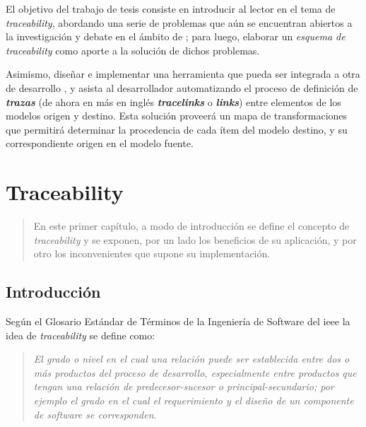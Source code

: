 \documentclass[a4paper,12pt,twoside,spanish,openright]{book}
\begin{document}
El objetivo del trabajo de tesis consiste en introducir al lector en el tema de \textit{traceability}, abordando una serie de problemas que aún se encuentran abiertos a la investigación y debate en el ámbito de ; para luego, elaborar un \textit{esquema de traceability} como aporte a la solución de dichos problemas.

Asimismo, diseñar e implementar una herramienta que pueda ser integrada a otra de desarrollo , y asista al desarrollador automatizando el proceso de definición de \textit{\textbf{trazas}} (de ahora en más en inglés \textit{\textbf{tracelinks}} o \textit{\textbf{links}}) entre elementos de los modelos origen y destino. Esta solución proveerá un mapa de transformaciones que permitirá determinar la procedencia de cada ítem del modelo destino, y su correspondiente origen en el modelo fuente.


\mainmatter

\chapter{Traceability}

\begin{quotation}
En este primer capítulo, a modo de introducción se define el concepto de \textit{traceability} y se exponen, por un lado los beneficios de su aplicación, y por otro los inconvenientes que supone su implementación.
\end{quotation}

\bigskip

\minitoc 

\clearpage

\section{Introducción}

Según el Glosario Estándar de Términos de la Ingeniería de Software del \gls{ieee} \cite{IEEE} la idea de \textit{traceability} se define como: 
\begin{quote}
\small \textit{El grado o nivel en el cual una relación puede ser establecida entre dos o más productos del proceso de desarrollo, especialmente entre productos que tengan una relación de predecesor-sucesor o principal-secundario; por ejemplo el grado en el cual el requerimiento y el diseño de un componente de software se corresponden}.
\end{quote}
\end{document}
